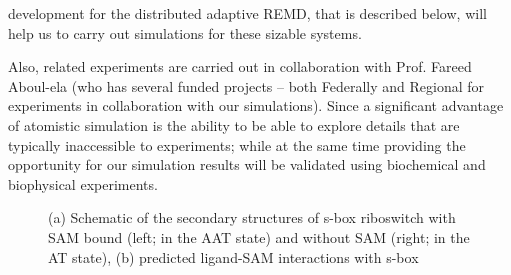 \documentclass[a4paper,10pt]{article}
\begin{document}
development for the distributed adaptive REMD, that is described below, will help us to carry out simulations for these sizable systems.

Also, related experiments are carried out in collaboration with Prof. Fareed Aboul-ela (who has several funded projects -- both Federally and Regional for experiments in collaboration with our simulations). Since a significant advantage of atomistic simulation is the ability to be able to explore details that are typically inaccessible to experiments; while at the same time providing the opportunity for our simulation results will be validated using biochemical and biophysical experiments.

\begin{figure}
\begin{center}
   \hspace{0.05in}
\end{center}
\caption{(a) Schematic of the secondary structures of s-box riboswitch with SAM bound (left; in the AAT state) and without SAM 
(right; in the AT state), (b) predicted ligand-SAM interactions with s-box}
\end{figure}
\end{document}
